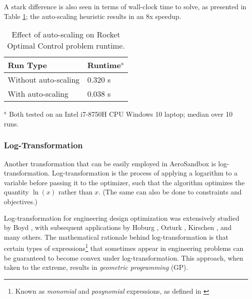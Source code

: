 A stark difference is also seen in terms of wall-clock time to solve, as presented in Table \ref{tab:scaling-compare}; the auto-scaling heuristic results in an 8x speedup.

\begin{table}[H]
    \begin{center}
        \caption{Effect of auto-scaling on Rocket Optimal Control problem runtime.}
        \label{tab:scaling-compare}

        \begin{tabular}[t]{ll}
            \toprule
            Run Type             & Runtime$^a$        \\
            \midrule
            Without auto-scaling & 0.320 \si{\second} \\
            With auto-scaling    & 0.038 \si{\second} \\
            \bottomrule
        \end{tabular}
    \end{center}
    \footnotesize{$^a$ Both tested on an Intel i7-8750H CPU Windows 10 laptop; median over 10 runs.}\\
\end{table}

\subsubsection{Log-Transformation}

Another transformation that can be easily employed in AeroSandbox is log-transformation. Log-transformation is the process of applying a logarithm to a variable before passing it to the optimizer, such that the algorithm optimizes the quantity $\ln(x)$ rather than $x$. (The same can also be done to constraints and objectives.)

Log-transformation for engineering design optimization was extensively studied by Boyd \cite{cvxbook}, with subsequent applications by Hoburg \cite{hoburg}, Ozturk \cite{Ozturk2018}, Kirschen \cite{kirschen}, and many others. The mathematical rationale behind log-transformation is that certain types of expressions\footnote{Known as \textit{monomial} and \textit{posynomial} expressions, as defined in \cite{hoburg}} that sometimes appear in engineering problems can be guaranteed to become convex under log-transformation. This approach, when taken to the extreme, results in \textit{geometric programming} (GP).%

